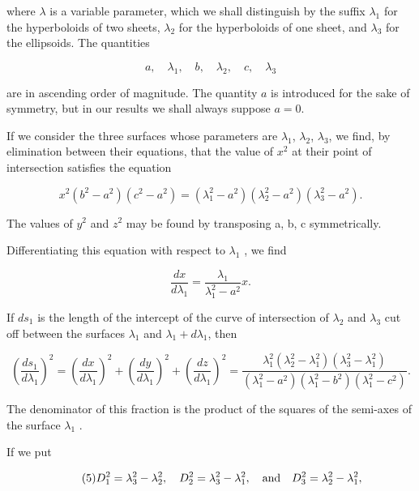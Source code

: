 \documentclass[11pt,a4paper]{article}
\begin{document}
where $\lambda$ is a variable parameter, which we shall distinguish by the suffix $\lambda_1$ for the hyperboloids of two sheets, $\lambda_2$ for the hyperboloids of one sheet, and $\lambda_3$ for the ellipsoids. The quantities

\[
a,\quad \lambda_1,\quad b,\quad \lambda_2,\quad c,\quad \lambda_3
\]

are in ascending order of magnitude. The quantity $a$ is introduced for the sake of symmetry, but in our results we shall always suppose $a=0$.

If we consider the three surfaces whose parameters are $\lambda_1$, $\lambda_2$, $\lambda_3$, we find, by elimination between their equations, that the value of $x^2$ at their point of intersection satisfies the equation

\begin{equation}\tag{2}
x^{2} (b^{2} - a^{2}) (c^{2} - a^{2}) = (\lambda_{1}^{2} - a^{2}) (\lambda_{2}^{2} - a^{2}) (\lambda_{3}^{2} - a^{2}).
\end{equation}

The values of  $y^2$  and  $z^2$  may be found by transposing a, b, c symmetrically.

Differentiating this equation with respect to  $\lambda_1$ , we find

\begin{equation}\tag{3}
\frac{dx}{d\lambda_1} = \frac{\lambda_1}{\lambda_1^2 - a^2} x.
\end{equation}

If $ds_1$ is the length of the intercept of the curve of intersection of $\lambda_2$ and $\lambda_3$ cut off between the surfaces $\lambda_1$ and $\lambda_1+d\lambda_1$, then

\begin{equation}\tag{4}
\left(\frac{ds_1}{d\lambda_1}\right)^2
=\left(\frac{dx}{d\lambda_1}\right)^2+\left(\frac{dy}{d\lambda_1}\right)^2+\left(\frac{dz}{d\lambda_1}\right)^2
=\frac{\lambda_1^2(\lambda_2^2-\lambda_1^2)(\lambda_3^2-\lambda_1^2)}
{(\lambda_1^2-a^2)(\lambda_1^2-b^2)(\lambda_1^2-c^2)}.
\end{equation}

The denominator of this fraction is the product of the squares of the semi-axes of the surface  $\lambda_1$ .

If we put

\begin{equation}\tag{5}
D_1^2=\lambda_3^2-\lambda_2^2,\quad
D_2^2=\lambda_3^2-\lambda_1^2,\quad\hbox{and}\quad
D_3^2=\lambda_2^2-\lambda_1^2,
\end{equation}
\end{document}
